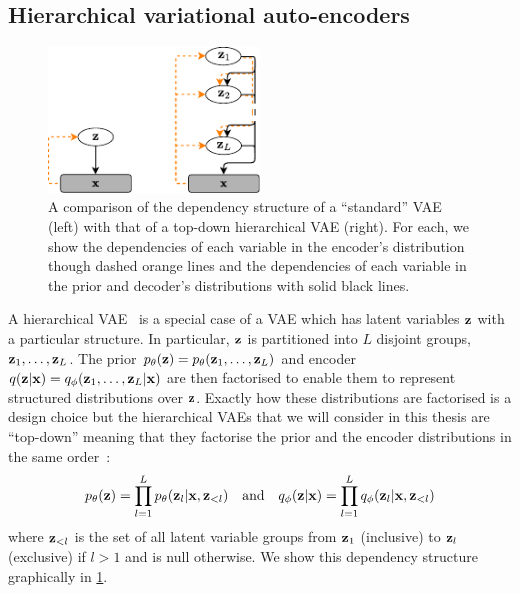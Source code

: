 \subsection{Hierarchical variational auto-encoders}
\label{sec:hierarchical-vae}
\begin{figure}
    \centering
    \includegraphics[width=0.5\textwidth]{figs/thesis/vae-vs-hierarchical-vae.pdf}
    \caption{A comparison of the dependency structure of a ``standard'' VAE (left) with that of a top-down hierarchical VAE (right). For each, we show the dependencies of each variable in the encoder's distribution though dashed orange lines and the dependencies of each variable in the prior and decoder's distributions with solid black lines.}
    \label{fig:vae-vs-hierarchical-vae}
\end{figure}
A hierarchical VAE~\citep{gregor2015draw,kingma2016improving,sonderby2016ladder,klushyn2019learning} is a special case of a VAE which has latent variables ${\mathbf{z}}$ with a particular structure. In particular, ${\mathbf{z}}$ is partitioned into $L$ disjoint groups, ${\mathbf{z}}_1,\ldots,{\mathbf{z}}_L$. The prior $p_\theta({\mathbf{z}}) = p_\theta({\mathbf{z}}_1,\ldots,{\mathbf{z}}_L)$ and encoder $q({\mathbf{z}}|{\mathbf{x}}) = q_\phi({\mathbf{z}}_1,\ldots,{\mathbf{z}}_L|{\mathbf{x}})$ are then factorised to enable them to represent structured distributions over ${\mathbf{z}}$. Exactly how these distributions are factorised is a design choice but the hierarchical VAEs that we will consider in this thesis are ``top-down'' meaning that they factorise the prior and the encoder distributions in the same order~\citep{vahdat2020nvae,child2020very}:
\begin{equation} \label{eq:hierarchical-vae-factorisations}
    p_\theta({\mathbf{z}}) = \prod_{l=1}^L p_\theta({\mathbf{z}}_l|{\mathbf{x}},{\mathbf{z}}_{<l}) \quad \text{and} \quad q_\phi({\mathbf{z}}|{\mathbf{x}}) = \prod_{l=1}^L q_\phi({\mathbf{z}}_l|{\mathbf{x}},{\mathbf{z}}_{<l})
\end{equation}
where ${\mathbf{z}}_{<l}$ is the set of all latent variable groups from ${\mathbf{z}}_1$ (inclusive) to ${\mathbf{z}}_{l}$ (exclusive) if $l > 1$ and is null otherwise. We show this dependency structure graphically in \cref{fig:vae-vs-hierarchical-vae}.

